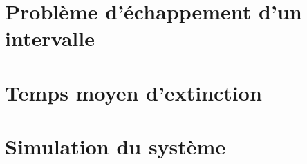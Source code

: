 \documentclass[openany,a4paper,12pt]{article}
\begin{document}
\section{Problème d'échappement d'un intervalle}

\section{Temps moyen d'extinction}

\section{Simulation du système}



		
\printbibliography
\end{document}
